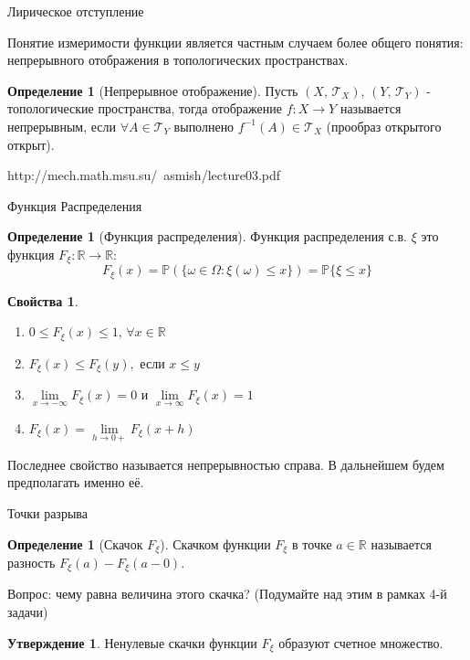 \documentclass{beamer}%
\theoremstyle{definition}
\newtheorem{mydef}[theorem]{Определение}
\newtheorem{properties}[theorem]{Свойства}
\newtheorem{proposition}[theorem]{Утверждение}
\begin{document}
\begin{frame}{Лирическое отступление}
    
    Понятие измеримости функции является частным случаем более общего понятия: непрерывного отображения в топологических пространствах.
    \begin{mydef}[Непрерывное отображение]
    Пусть $(X,\, \mathcal{T}_X)$, $(Y,\, \mathcal{T}_Y)$ - топологические пространства, тогда отображение $f: X \to Y$ называется непрерывным, если
    $\forall A \in \mathcal{T}_Y$ выполнено $f^{-1}(A) \in \mathcal{T}_X$ (прообраз открытого открыт).
    \end{mydef}
    http://mech.math.msu.su/~asmish/lecture03.pdf
    
\end{frame}

\begin{frame}{Функция Распределения}
    \begin{mydef}[Функция распределения]
    Функция распределения с.в. $\xi$ это функция $F_\xi: \mathbb{R}\to\mathbb{R}$: $$F_\xi(x) = \mathbb{P}(\{\omega \in \Omega : \xi(\omega) \leq x\}) = \mathbb{P}\{\xi \le x\}$$
    \end{mydef} %

    \begin{properties}
    \begin{enumerate}
        \item $0 \leq F_\xi (x) \leq 1,\, \forall x \in \mathbb{R}$ 
        \item $F_\xi (x) \leq F_\xi (y),$ если $x \leq y$
        \item $\lim \limits_{x \rightarrow -\infty} F_\xi (x) = 0$ и $\lim \limits_{x\rightarrow \infty} F_\xi (x) = 1$
        \item $F_\xi (x) = \lim \limits_{h \rightarrow 0 +} F_\xi (x + h)$
    \end{enumerate}
    \end{properties}
    
    Последнее свойство называется непрерывностью справа. В дальнейшем будем предполагать именно её.
    
    
\end{frame}

\begin{frame}{Точки разрыва}
    \begin{mydef}[Скачок $F_\xi$]
    Скачком функции $F_\xi$ в точке $a \in \mathbb{R}$ называется разность $F_\xi (a) - F_\xi (a-0)$.
    \end{mydef}

Вопрос: чему равна величина этого скачка? (Подумайте над этим в рамках 4-й задачи)

\begin{proposition}
    Ненулевые скачки функции $F_\xi$ образуют счетное множество.
\end{proposition}

\end{frame}
\end{document}
